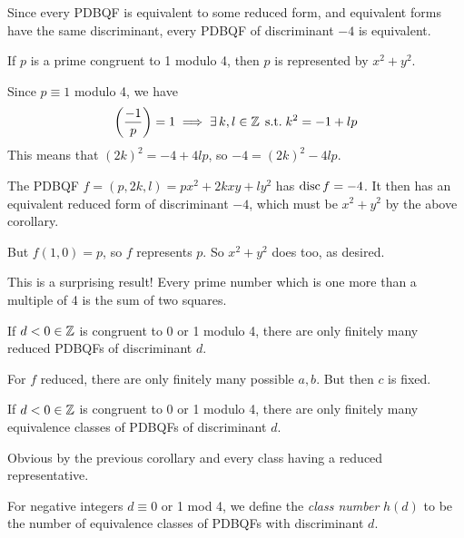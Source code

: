 \documentclass{article}
\begin{document}
\begin{corollary}
    Since every PDBQF is equivalent to some reduced form, and equivalent forms have the same discriminant, every PDBQF of discriminant $-4$ is equivalent.
\end{corollary}

\begin{proposition}
	If $p$ is a prime congruent to 1 modulo 4, then $p$ is represented by $x^2 + y^2$.    
\end{proposition}

\begin{prf}
    Since $p \equiv 1$ modulo 4, we have
    \[
	\left( \frac{-1}{p} \right) = 1 \implies \exists \, k, l \in \mathbb{Z} \mathrel{\, \text{s.t.}} k^2 = -1 + lp
	\]
	This means that $(2k)^2 = -4 + 4lp$, so $-4 = (2k)^2 - 4lp$.
	
	The PDBQF $f = (p, 2k, l) = px^2 + 2kxy + ly^2$ has $\operatorname{disc} f = -4$. It then has an equivalent reduced form of discriminant $-4$, which must be $x^2 + y^2$ by the above corollary.
	
	But $f(1, 0) = p$, so $f$ represents $p$. So $x^2 + y^2$ does too, as desired.
\end{prf}

This is a surprising result! Every prime number which is one more than a multiple of 4 is the sum of two squares.

\begin{corollary}
    If $d < 0 \in \mathbb{Z}$ is congruent to 0 or 1 modulo 4, there are only finitely many reduced PDBQFs of discriminant $d$.
\end{corollary}

\begin{prf}
    For $f$ reduced, there are only finitely many possible $a, b$. But then $c$ is fixed.
\end{prf}

\begin{corollary}
    If $d < 0 \in \mathbb{Z}$ is congruent to 0 or 1 modulo 4, there are only finitely many equivalence classes of PDBQFs of discriminant $d$.
\end{corollary}

\begin{prf}
    Obvious by the previous corollary and every class having a reduced representative.
\end{prf}

\begin{definition}
	\label{class-number}
    For negative integers $d \equiv 0$ or 1 mod 4, we define the \textit{class number} $h(d)$ to be the number of equivalence classes of PDBQFs with discriminant $d$.
\end{definition}
\end{document}
